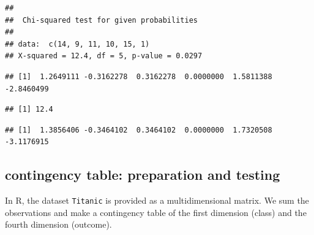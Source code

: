 \documentclass[
]{book}
\newenvironment{Shaded}{\begin{snugshade}}{\end{snugshade}}
\newcommand{\CommentTok}[1]{\textcolor[rgb]{0.56,0.35,0.01}{\textit{#1}}}
\newcommand{\DecValTok}[1]{\textcolor[rgb]{0.00,0.00,0.81}{#1}}
\newcommand{\FunctionTok}[1]{\textcolor[rgb]{0.00,0.00,0.00}{#1}}
\newcommand{\NormalTok}[1]{#1}
\newcommand{\SpecialCharTok}[1]{\textcolor[rgb]{0.00,0.00,0.00}{#1}}
\begin{document}
\begin{verbatim}
## 
##  Chi-squared test for given probabilities
## 
## data:  c(14, 9, 11, 10, 15, 1)
## X-squared = 12.4, df = 5, p-value = 0.0297
\end{verbatim}

\begin{Shaded}
\end{Shaded}

\begin{verbatim}
## [1]  1.2649111 -0.3162278  0.3162278  0.0000000  1.5811388 -2.8460499
\end{verbatim}

\begin{Shaded}
\end{Shaded}

\begin{verbatim}
## [1] 12.4
\end{verbatim}

\begin{Shaded}
\end{Shaded}

\begin{verbatim}
## [1]  1.3856406 -0.3464102  0.3464102  0.0000000  1.7320508 -3.1176915
\end{verbatim}

\hypertarget{contingency-table-preparation-and-testing}{%
\subsection{contingency table: preparation and testing}\label{contingency-table-preparation-and-testing}}

In R, the dataset \texttt{Titanic} is provided as a multidimensional matrix. We sum
the observations and make a contingency table of the first dimension (class) and
the fourth dimension (outcome).
\end{document}
